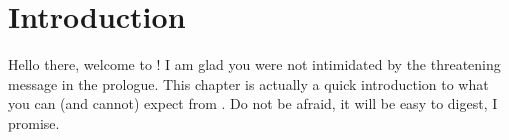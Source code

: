 \documentclass[a4paper,twoside,12pt]{memoir}
\begin{document}
\chapter{Introduction}
\label{chap:introduction}

Hello there, welcome to \arara! I am glad you were not
intimidated by the threatening message in the prologue.
This chapter is actually a quick introduction to what
you can (and cannot) expect from \arara. Do not be
afraid, it will be easy to digest, I promise.

%
%
%
%
%
%
%
%
%
%
\end{document}
